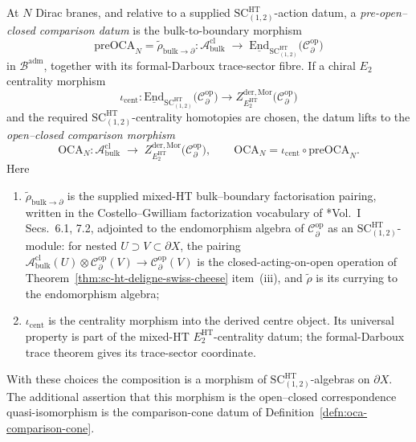 \begin{defn}\label{defn:oca-comparison}
At \(N\) Dirac branes, and relative to a supplied
\(\mathrm{SC}^{\mathrm{HT}}_{(1,2)}\)-action datum, a
\emph{pre-open--closed comparison datum} is the bulk-to-boundary
morphism
\begin{equation}\label{eq:pre-oca-definition}
  \mathrm{preOCA}_N=
  \widetilde{\rho}_{\mathrm{bulk}\to\partial}\colon
    \mathcal A^{\mathrm{cl}}_{\mathrm{bulk}}
    \;\longrightarrow\;
    \underline{\mathrm{End}}_{\mathrm{SC}^{\mathrm{HT}}_{(1,2)}}\!
      \bigl(\mathcal C^{\mathrm{op}}_\partial\bigr)
\end{equation}
in \(\mathcal B^{\mathrm{adm}}\), together with its formal-Darboux
trace-sector fibre.  If a chiral \(E_2\) centrality morphism
\[
  \iota_{\mathrm{cent}}\colon
    \underline{\mathrm{End}}_{\mathrm{SC}^{\mathrm{HT}}_{(1,2)}}\!
      \bigl(\mathcal C^{\mathrm{op}}_\partial\bigr)
    \longrightarrow
    Z^{\mathrm{der},\mathrm{Mor}}_{E_2^{\mathrm{HT}}}\!\bigl(
      \mathcal C^{\mathrm{op}}_\partial\bigr)
\]
and the required \(\mathrm{SC}^{\mathrm{HT}}_{(1,2)}\)-centrality
homotopies are chosen, the datum lifts to the
\emph{open--closed comparison morphism}
\begin{equation}\label{eq:oca-definition}
  \mathrm{OCA}_N\colon
    \mathcal A^{\mathrm{cl}}_{\mathrm{bulk}}
    \;\longrightarrow\;
    Z^{\mathrm{der},\mathrm{Mor}}_{E_2^{\mathrm{HT}}}\!\bigl(
      \mathcal C^{\mathrm{op}}_\partial\bigr),
  \qquad
  \mathrm{OCA}_N
   =
   \iota_{\mathrm{cent}}\circ\mathrm{preOCA}_N .
\end{equation}
Here
\begin{enumerate}[label=\textup{(\roman*)}]
  \item \(\widetilde{\rho}_{\mathrm{bulk}\to\partial}\) is the supplied
        mixed-HT bulk--boundary factorisation pairing, written in the
        Costello--Gwilliam factorization vocabulary of
        \cite{costello-gwilliam}*{Vol.~I Secs.~6.1, 7.2}, adjointed to the
        endomorphism algebra of \(\mathcal C^{\mathrm{op}}_\partial\)
        as an \(\mathrm{SC}^{\mathrm{HT}}_{(1,2)}\)-module: for nested
        \(U\supset V\subset\partial X\), the pairing
        \(\mathcal A^{\mathrm{cl}}_{\mathrm{bulk}}(U)\otimes
        \mathcal C^{\mathrm{op}}_\partial(V)\to
        \mathcal C^{\mathrm{op}}_\partial(V)\) is the closed-acting-on-open
        operation of Theorem~\ref{thm:sc-ht-deligne-swiss-cheese} item~(iii),
        and \(\widetilde\rho\) is its currying to the endomorphism algebra;
  \item \(\iota_{\mathrm{cent}}\) is the centrality morphism into the
        derived centre object.  Its universal property is part of the
        mixed-HT \(E_2^{\mathrm{HT}}\)-centrality datum; the formal-Darboux trace
        theorem gives its trace-sector coordinate.
\end{enumerate}
With these choices the composition is a morphism of
\(\mathrm{SC}^{\mathrm{HT}}_{(1,2)}\)-algebras on \(\partial X\).  The
additional assertion that this morphism is the open--closed
correspondence quasi-isomorphism is the comparison-cone datum of
Definition~\ref{defn:oca-comparison-cone}.
\end{defn}

